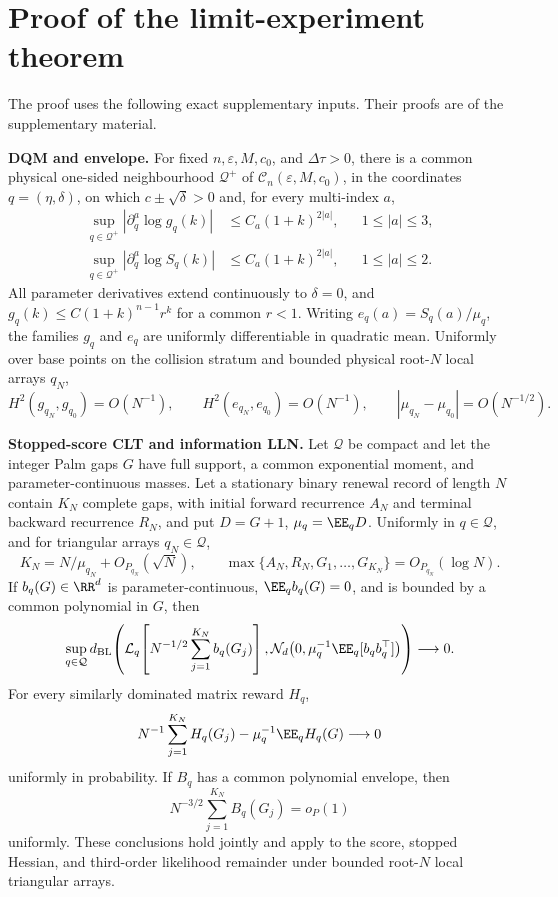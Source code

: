 \section{Proof of the limit-experiment theorem}
\label{sec:main-proofs-main}

The proof uses the following exact supplementary inputs.  Their proofs are
of the supplementary material.

\smallskip\noindent\textbf{DQM and envelope.}
For fixed \(n,\varepsilon,M,c_0\), and \(\Delta\tau>0\), there is a common
physical one-sided neighbourhood \(\mathcal Q^+\) of
\(\mathcal C_n(\varepsilon,M,c_0)\), in the coordinates
\(q=(\eta,\delta)\), on which \(c\pm\sqrt\delta>0\) and, for every
multi-index \(a\),
\[
\begin{aligned}
 \sup_{q\in\mathcal Q^+}|\partial_q^a\log g_q(k)|
 &\le C_a(1+k)^{2|a|},&& 1\le|a|\le3,\\
 \sup_{q\in\mathcal Q^+}|\partial_q^a\log S_q(k)|
 &\le C_a(1+k)^{2|a|},&& 1\le|a|\le2.
\end{aligned}
\]
All parameter derivatives extend continuously to \(\delta=0\), and
\(g_q(k)\le C(1+k)^{n-1}r^k\) for a common \(r<1\).  Writing
\(e_q(a)=S_q(a)/\mu_q\), the families \(g_q\) and \(e_q\) are uniformly
differentiable in quadratic mean.  Uniformly over base points on the collision
stratum and bounded physical root-\(N\) local arrays \(q_N\),
\[
 H^2(g_{q_N},g_{q_0})=O(N^{-1}),\qquad
 H^2(e_{q_N},e_{q_0})=O(N^{-1}),\qquad
 |\mu_{q_N}-\mu_{q_0}|=O(N^{-1/2}).
\]

\smallskip\noindent\textbf{Stopped-score CLT and information LLN.}
Let \(\mathcal Q\) be compact and let the integer Palm gaps \(G\) have full
support, a common exponential moment, and parameter-continuous masses.  Let a
stationary binary renewal record of length \(N\) contain \(K_N\) complete
gaps, with initial forward recurrence \(A_N\) and terminal backward recurrence
\(R_N\), and put \(D=G+1\), \(\mu_q=\EE_qD\).  Uniformly in
\(q\in\mathcal Q\), and for triangular arrays \(q_N\in\mathcal Q\),
\[
 K_N=N/\mu_{q_N}+O_{P_{q_N}}(\sqrt N),\qquad
 \max\{A_N,R_N,G_1,\ldots,G_{K_N}\}=O_{P_{q_N}}(\log N).
\]
If \(b_q(G)\in\RR^d\) is parameter-continuous, \(\EE_qb_q(G)=0\), and is
bounded by a common polynomial in \(G\), then
\[
 \sup_{q\in\mathcal Q}d_{\rm BL}\!\left(
 \mathcal L_q\!\left[N^{-1/2}\sum_{j=1}^{K_N}b_q(G_j)\right],
 \mathcal N_d\!\left(0,\mu_q^{-1}\EE_q[b_qb_q^\top]\right)
 \right)\longrightarrow0.
\]
For every similarly dominated matrix reward \(H_q\),
\[
 N^{-1}\sum_{j=1}^{K_N}H_q(G_j)
 -\mu_q^{-1}\EE_qH_q(G)\longrightarrow0
\]
uniformly in probability.  If \(B_q\) has a common polynomial envelope, then
\[
 N^{-3/2}\sum_{j=1}^{K_N}B_q(G_j)=o_P(1)
\]
uniformly.  These conclusions hold jointly and apply to the score, stopped
Hessian, and third-order likelihood remainder under bounded root-\(N\) local
triangular arrays.

